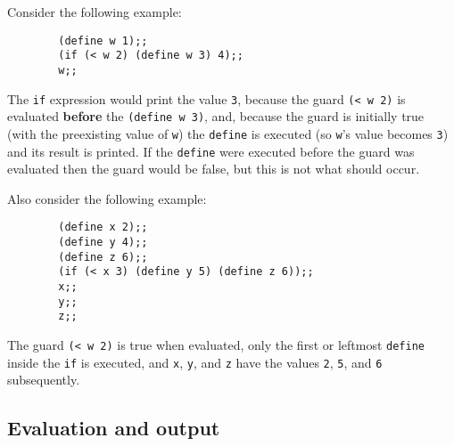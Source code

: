 \documentclass[11pt]{article}
\begin{document}
      Consider the following example:

      \vspace{-2mm}

      \begin{center}

        \begin{BVerbatim}
        (define w 1);;
        (if (< w 2) (define w 3) 4);;
        w;;
        \end{BVerbatim}

      \end{center}

      \vspace{-2mm}

      The \texttt{if} expression would print the value \texttt{3}, because the
    guard \texttt{(< w 2)} is evaluated \textbf{before} the \texttt{(define
    w 3)}, and, because the guard is initially true (with the preexisting
    value of \texttt{w}) the \texttt{define} is executed (so \texttt{w}'s
    value becomes \texttt{3}) and its result is printed.  If the
    \texttt{define} were executed before the guard was evaluated then the
    guard would be false, but this is not what should occur.

      Also consider the following example:

      \vspace{-2mm}

      \begin{center}

        \begin{BVerbatim}
        (define x 2);;
        (define y 4);;
        (define z 6);;
        (if (< x 3) (define y 5) (define z 6));;
        x;;
        y;;
        z;;
        \end{BVerbatim}

      \end{center}

      \vspace{-2mm}

      The guard \texttt{(< w 2)} is true when evaluated, only the first or
    leftmost \texttt{define} inside the \texttt{if} is executed, and
    \texttt{x}, \texttt{y}, and \texttt{z} have the values \texttt{2},
    \texttt{5}, and \texttt{6} subsequently.

    \subsection{Evaluation and output}
\end{document}
